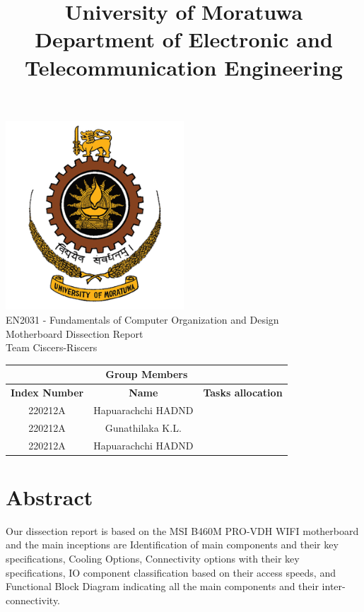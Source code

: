 \documentclass{article}
\title{University of Moratuwa\\
    Department of Electronic and Telecommunication Engineering\\}
\begin{document}
\maketitle

\vspace{5pt}

\begin{center}
	\includegraphics[width=0.5\textwidth]{University_of_Moratuwa_logo.png}
	\\
	\LARGE EN2031 - Fundamentals of Computer Organization and Design
	\\
	\vspace{5pt}
	{Motherboard Dissection Report}\\
	{Team Ciscers-Riscers}
\end{center}

\begin{center}
	\vspace{0.5cm} %
	\renewcommand{\arraystretch}{2} %
	\begin{tabular}{|c|c|c|}
		\hline
		\multicolumn{3}{|c|}{\textbf{Group Members}} \\
		\hline
		\textbf{Index Number} & \textbf{Name}  &\textbf{Tasks allocation}  \\
		\hline
		220212A      & Hapuarachchi HADND  & \\
		\hline
		220212A      & Gunathilaka K.L.   & \\
		\hline
		220212A      & Hapuarachchi HADND & \\
		\hline
	\end{tabular}
\end{center}

\newpage

\tableofcontents

\section{Abstract}
\fontsize{12pt}{13pt}\selectfont
Our dissection report is based on the MSI B460M PRO-VDH WIFI motherboard
and the main inceptions are Identification of main components and their
key specifications, Cooling Options, Connectivity options with their key
specifications, IO component classification based on their access speeds,
and Functional Block Diagram indicating all the main components and their
inter-connectivity.
\end{document}
